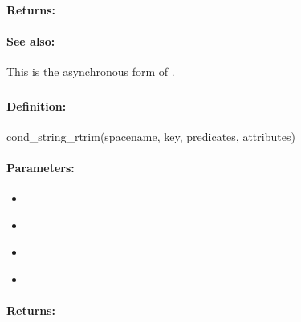 \paragraph{Returns:}


\paragraph{See also:}  This is the asynchronous form of .

\pagebreak
\subsubsection{}
\label{api:ruby:cond_string_rtrim}


\paragraph{Definition:}
\begin{rubycode}
cond_string_rtrim(spacename, key, predicates, attributes)
\end{rubycode}

\paragraph{Parameters:}
\begin{itemize}[noitemsep]
\item {}\\

\item {}\\

\item {}\\

\item {}\\

\end{itemize}

\paragraph{Returns:}


